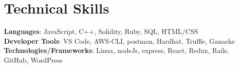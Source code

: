 \documentclass[letterpaper,11pt]{article}
\newcommand{\resumeSubHeadingListStart}{\begin{itemize}[leftmargin=*]}
\newcommand{\resumeSubHeadingListEnd}{\end{itemize}}
\begin{document}
%

\section{Technical Skills}
\begin{itemize}[leftmargin=0.15in, label={}]
	\small{\item{
			\textbf{Languages}{: JavaScript, C++, Solidity, Ruby, SQL, HTML/CSS} \\
			\textbf{Developer Tools}{: VS Code, AWS-CLI, postman, Hardhat, Truffle, Ganache} \\
			\textbf{Technologies/Frameworks}{: Linux, nodeJs, express, React, Redux, Rails, GitHub, WordPress} \\
	}}
\end{itemize}
\vspace{-16pt}

\end{document}
